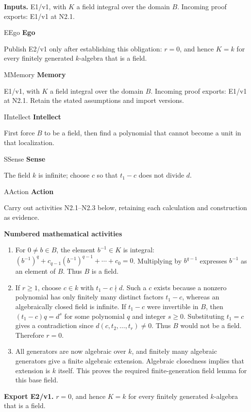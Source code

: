 \documentclass[preprint,12pt,aps,pra,showkeys,amsmath,amssymb,superscriptaddress,floatfix]{revtex4-2}
\theoremstyle{definition}
\theoremstyle{remark}
\newcommand{\mmfaculty}[3]{%
 \begin{mmfacultybox}{#1}{#2}
 {\sffamily\bfseries\color{MMBlue}#2}\par\smallskip #3
 \end{mmfacultybox}}
\newcommand{\field}[2]{\par\smallskip\noindent\textbf{#1.} #2\par}
\begin{document}
\field{Inputs}{E1/v1, with \(K\) a field integral over the domain \(B\). Incoming proof
exports: E1/v1 at N2.1.}

\mmfaculty{E}{Ego}{Publish E2/v1 only after establishing this obligation: \(r=0\), and
hence \(K=k\) for every finitely generated \(k\)-algebra that is a
field.}

\mmfaculty{M}{Memory}{E1/v1, with \(K\) a field integral over the domain \(B\). Incoming proof
exports: E1/v1 at N2.1. Retain the stated assumptions and import
versions.}

\mmfaculty{I}{Intellect}{First force \(B\) to be a field, then find a polynomial that cannot
become a unit in that localization.}

\mmfaculty{S}{Sense}{The field \(k\) is infinite; choose \(c\) so that \(t_1-c\) does not
divide \(d\).}

\mmfaculty{A}{Action}{Carry out activities N2.1--N2.3 below, retaining each calculation and
construction as evidence.}

\smallskip\noindent\textbf{Numbered mathematical activities}

\begin{enumerate}[label=N2.\arabic*,leftmargin=3.4em]

\item For \(0\ne b\in B\), the element \(b^{-1}\in K\) is integral:
\((b^{-1})^q+c_{q-1}(b^{-1})^{q-1}+\cdots+c_0=0\). Multiplying by
\(b^{q-1}\) expresses \(b^{-1}\) as an element of \(B\). Thus \(B\) is a
field.

\item If \(r\ge1\), choose \(c\in k\) with \(t_1-c\nmid d\). Such a \(c\)
exists because a nonzero polynomial has only finitely many distinct
factors \(t_1-c\), whereas an algebraically closed field is infinite. If
\(t_1-c\) were invertible in \(B\), then \((t_1-c)q=d^s\) for some
polynomial \(q\) and integer \(s\ge0\). Substituting \(t_1=c\) gives a
contradiction since \(d(c,t_2,\ldots,t_r)\ne0\). Thus \(B\) would not be
a field. Therefore \(r=0\).

\item All generators are now algebraic over \(k\), and finitely many algebraic
generators give a finite algebraic extension. Algebraic closedness
implies that extension is \(k\) itself. This proves the required
finite-generation field lemma for this base field.

\end{enumerate}

\field{Export E2/v1}{\(r=0\), and hence \(K=k\) for every finitely generated \(k\)-algebra
that is a field.}
\end{document}
